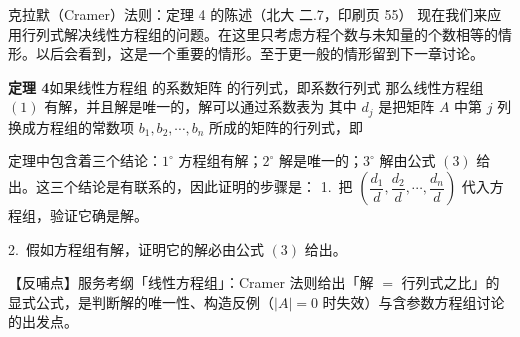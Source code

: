 
\begin{fdeep}{克拉默（Cramer）法则：定理 4 的陈述（北大 二.7，印刷页 55）}
现在我们来应用行列式解决线性方程组的问题。在这里只考虑方程个数与未知量的个数相等的情形。以后会看到，这是一个重要的情形。至于更一般的情形留到下一章讨论。

\textbf{定理 4}\quad 如果线性方程组
的系数矩阵
的行列式，即系数行列式
那么线性方程组 $(1)$ 有解，并且解是唯一的，解可以通过系数表为
其中 $d_j$ 是把矩阵 $A$ 中第 $j$ 列换成方程组的常数项 $b_1,b_2,\cdots,b_n$ 所成的矩阵的行列式，即

定理中包含着三个结论：$1^{\circ}$ 方程组有解；$2^{\circ}$ 解是唯一的；$3^{\circ}$ 解由公式 $(3)$ 给出。这三个结论是有联系的，因此证明的步骤是：
1.\ 把 $\left(\dfrac{d_1}{d},\dfrac{d_2}{d},\cdots,\dfrac{d_n}{d}\right)$ 代入方程组，验证它确是解。

2.\ 假如方程组有解，证明它的解必由公式 $(3)$ 给出。

【反哺点】服务考纲「线性方程组」：Cramer 法则给出「解 $=$ 行列式之比」的显式公式，是判断解的唯一性、构造反例（$|A|=0$ 时失效）与含参数方程组讨论的出发点。
\end{fdeep}

